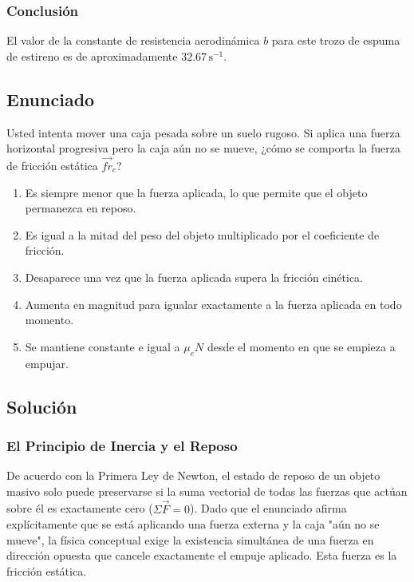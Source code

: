 \documentclass[12pt]{article}
\begin{document}
\subsubsection*{Conclusión}
El valor de la constante de resistencia aerodinámica $b$ para este trozo de espuma de estireno es de aproximadamente $32.67 \, \text{s}^{-1}$.

\newpage

\subsection*{Enunciado}
Usted intenta mover una caja pesada sobre un suelo rugoso. Si aplica una fuerza horizontal progresiva pero la caja aún no se mueve, ¿cómo se comporta la fuerza de fricción estática $\vec{fr}_e$?
\begin{enumerate}
    \item[a)] Es siempre menor que la fuerza aplicada, lo que permite que el objeto permanezca en reposo.
    \item[b)] Es igual a la mitad del peso del objeto multiplicado por el coeficiente de fricción.
    \item[c)] Desaparece una vez que la fuerza aplicada supera la fricción cinética.
    \item[d)] Aumenta en magnitud para igualar exactamente a la fuerza aplicada en todo momento.
    \item[e)] Se mantiene constante e igual a $\mu_e N$ desde el momento en que se empieza a empujar.
\end{enumerate}

\subsection*{Solución}

\subsubsection*{El Principio de Inercia y el Reposo}
De acuerdo con la Primera Ley de Newton, el estado de reposo de un objeto masivo solo puede preservarse si la suma vectorial de todas las fuerzas que actúan sobre él es exactamente cero ($\Sigma \vec{F} = 0$). Dado que el enunciado afirma explícitamente que se está aplicando una fuerza externa y la caja "aún no se mueve", la física conceptual exige la existencia simultánea de una fuerza en dirección opuesta que cancele exactamente el empuje aplicado. Esta fuerza es la fricción estática.
\end{document}

